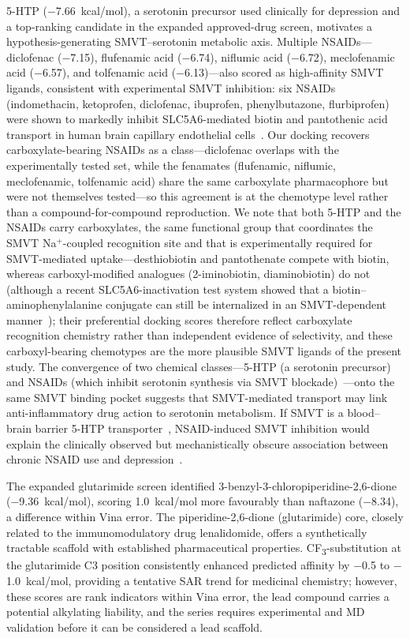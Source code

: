 \documentclass[pdflatex,sn-nature]{sn-jnl}
\begin{document}
5-HTP ($-$7.66~kcal/mol), a serotonin precursor used clinically for depression and a top-ranking candidate in the expanded approved-drug screen, motivates a hypothesis-generating SMVT--serotonin metabolic axis. Multiple NSAIDs---diclofenac ($-$7.15), flufenamic acid ($-$6.74), niflumic acid ($-$6.72), meclofenamic acid ($-$6.57), and tolfenamic acid ($-$6.13)---also scored as high-affinity SMVT ligands, consistent with experimental SMVT inhibition: six NSAIDs (indomethacin, ketoprofen, diclofenac, ibuprofen, phenylbutazone, flurbiprofen) were shown to markedly inhibit SLC5A6-mediated biotin and pantothenic acid transport in human brain capillary endothelial cells~\cite{uchida2015}. Our docking recovers carboxylate-bearing NSAIDs as a class---diclofenac overlaps with the experimentally tested set, while the fenamates (flufenamic, niflumic, meclofenamic, tolfenamic acid) share the same carboxylate pharmacophore but were not themselves tested---so this agreement is at the chemotype level rather than a compound-for-compound reproduction. We note that both 5-HTP and the NSAIDs carry carboxylates, the same functional group that coordinates the SMVT \mbox{Na$^+$}-coupled recognition site and that is experimentally required for SMVT-mediated uptake---desthiobiotin and pantothenate compete with biotin, whereas carboxyl-modified analogues (2-iminobiotin, diaminobiotin) do not~\cite{tripathi2025,park2005} (although a recent SLC5A6-inactivation test system showed that a biotin--aminophenylalanine conjugate can still be internalized in an SMVT-dependent manner~\cite{rudenko2025}); their preferential docking scores therefore reflect carboxylate recognition chemistry rather than independent evidence of selectivity, and these carboxyl-bearing chemotypes are the more plausible SMVT ligands of the present study. The convergence of two chemical classes---5-HTP (a serotonin precursor) and NSAIDs (which inhibit serotonin synthesis via SMVT blockade)~\cite{shaikh2023}---onto the same SMVT binding pocket suggests that SMVT-mediated transport may link anti-inflammatory drug action to serotonin metabolism. If SMVT is a blood--brain barrier 5-HTP transporter~\cite{hardebo1979,agren1991}, NSAID-induced SMVT inhibition would explain the clinically observed but mechanistically obscure association between chronic NSAID use and depression~\cite{shaikh2023}.

The expanded glutarimide screen identified 3-benzyl-3-chloropiperidine-2,6-dione ($-$9.36~kcal/mol), scoring 1.0~kcal/mol more favourably than naftazone ($-$8.34), a difference within Vina error. The piperidine-2,6-dione (glutarimide) core, closely related to the immunomodulatory drug lenalidomide, offers a synthetically tractable scaffold with established pharmaceutical properties. CF\textsubscript{3}-substitution at the glutarimide C3 position consistently enhanced predicted affinity by $-$0.5 to $-$1.0~kcal/mol, providing a tentative SAR trend for medicinal chemistry; however, these scores are rank indicators within Vina error, the lead compound carries a potential alkylating liability, and the series requires experimental and MD validation before it can be considered a lead scaffold.
\end{document}
